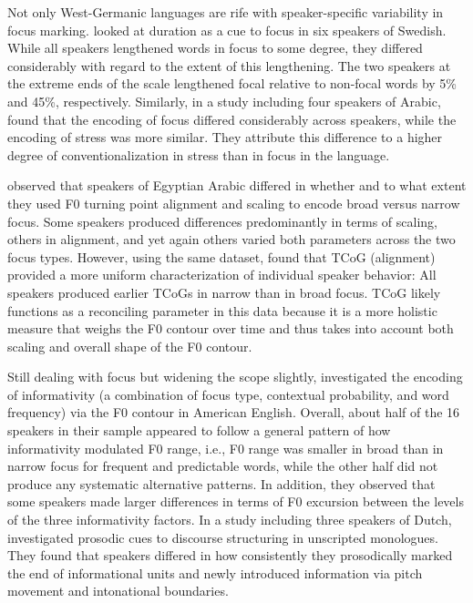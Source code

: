 Not only West-Germanic languages are rife with speaker-specific variability in focus marking. \citet{heldnerTemporalEffectsFocus2001} looked at duration as a cue to focus in six speakers of Swedish. While all speakers lengthened words in focus to some degree, they differed considerably with regard to the extent of this lengthening. The two speakers at the extreme ends of the scale lengthened focal relative to non-focal words by 5\% and 45\%, respectively.
Similarly, in a study including four speakers of Arabic, \citet{dejongComparingStressLexical2002} found that the encoding of focus differed considerably across speakers, while the encoding of stress was more similar. They attribute this difference to a higher degree of conventionalization in stress than in focus in the language.

\citet{cangemiSpeakerspecificIntonationalMarking2016} observed that speakers of Egyptian Arabic differed in whether and to what extent they used F0 turning point alignment and scaling to encode broad versus narrow focus. Some speakers produced differences predominantly in terms of scaling, others in alignment, and yet again others varied both parameters across the two focus types. However, using the same dataset, \citet{bruggemanUnifyingSpeakerVariability2017} found that TCoG (alignment) provided a more uniform characterization of individual speaker behavior: All speakers produced earlier TCoGs in narrow than in broad focus. TCoG likely functions as a reconciling parameter in this data because it is a more holistic measure that weighs the F0 contour over time and thus takes into account both scaling and overall shape of the F0 contour.

Still dealing with focus but widening the scope slightly, \citet{ouyangIndividualDifferencesProsodic2015} investigated the encoding of informativity (a combination of focus type, contextual probability, and word frequency) via the F0 contour in American English. Overall, about half of the 16 speakers in their sample appeared to follow a general pattern of how informativity modulated F0 range, i.e., F0 range was smaller in broad than in narrow focus for frequent and predictable words, while the other half did not produce any systematic alternative patterns. In addition, they observed that some speakers made larger differences in terms of F0 excursion between the levels of the three informativity factors. In a study including three speakers of Dutch, \citet{swertsProsodyMarkerInformation1994} investigated prosodic cues to discourse structuring in unscripted monologues. They found that speakers differed in how consistently they prosodically marked the end of informational units and newly introduced information via pitch movement and intonational boundaries. 

